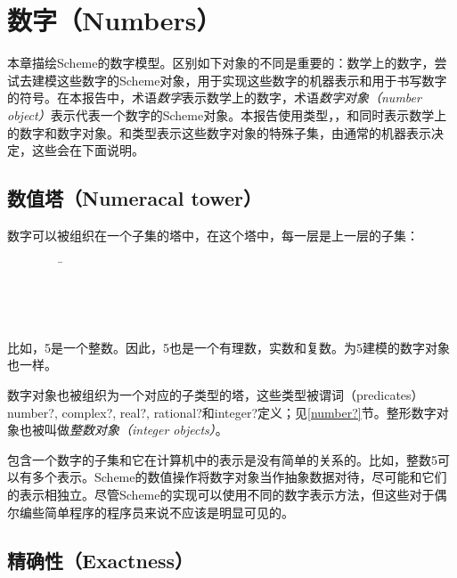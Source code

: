 \chapter{数字（Numbers）}
\label{numbertypeschapter}

本章描绘Scheme的数字模型。区别如下对象的不同是重要的：数学上的数字，尝试去建模这些数字的Scheme对象，用于实现这些数字的机器表示和用于书写数字的符号。在本报告中，术语\textit{数字}表示数学上的数字，术语\textit{数字对象（number object）}表示代表一个数字的Scheme对象。本报告使用类型，，和同时表示数学上的数字和数字对象。和类型表示这些数字对象的特殊子集，由通常的机器表示决定，这些会在下面说明。

\section{数值塔（Numeracal tower）}
\label{numericaltypes}

数字可以被组织在一个子集的塔中，在这个塔中，每一层是上一层的子集：
\begin{tabbing}
\ \ \ \ \ \ \ \ \ \= \\
\>  \\
\>  \\
\>  \\
\> 
\end{tabbing}

比如，5是一个整数。因此，5也是一个有理数，实数和复数。为5建模的数字对象也一样。

数字对象也被组织为一个对应的子类型的塔，这些类型被谓词（predicates）{\cf number?}, {\cf complex?}, {\cf real?}, {\cf rational?}和{\cf integer?}定义；见\ref{number?}节。整形数字对象也被叫做\textit{整数对象（integer objects）}。

包含一个数字的子集和它在计算机中的表示是没有简单的关系的。比如，整数5可以有多个表示。Scheme的数值操作将数字对象当作抽象数据对待，尽可能和它们的表示相独立。尽管Scheme的实现可以使用不同的数字表示方法，但这些对于偶尔编些简单程序的程序员来说不应该是明显可见的。

\section{精确性（Exactness）}
\label{exactly}

